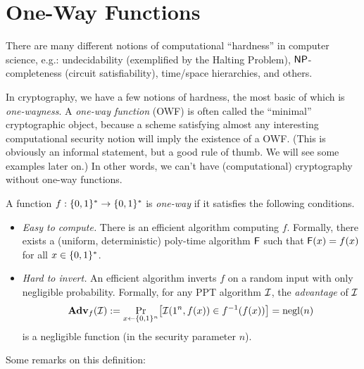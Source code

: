 \documentclass[11pt]{article}
\begin{document}
\section{One-Way Functions}
\label{sec:one-way-functions}

There are many different notions of computational ``hardness'' in
computer science, e.g.: undecidability (exemplified by the Halting
Problem), $\mathsf{NP}$-completeness (circuit satisfiability), time/space
hierarchies, and others.

In cryptography, we have a few notions of hardness, the most basic of
which is \emph{one-wayness}.  A \emph{one-way function} (OWF) is often
called the ``minimal'' cryptographic object, because a scheme
satisfying almost any interesting computational security notion will
imply the existence of a OWF.  (This is obviously an informal
statement, but a good rule of thumb.  We will see some examples later
on.)  In other words, we can't have (computational) cryptography
without one-way functions.

\begin{definition}
  \label{def:owf}
  A function $f : \{0,1\}^{*} \to \{0,1\}^{*}$ is \emph{one-way} if it
  satisfies the following conditions.
  \begin{itemize}
  \item \emph{Easy to compute.}  There is an efficient algorithm
    computing $f$.  Formally, there exists a (uniform, deterministic)
    poly-time algorithm $\mathsf{F}$ such that $\mathsf{F}(x) = f(x)$ for
    all $x \in \{0,1\}^{*}$.
  \item \emph{Hard to invert.}  An efficient algorithm inverts $f$ on
    a random input with only negligible probability.  Formally, for
    any PPT algorithm $\mathcal{I}$, the \emph{advantage} of
    $\mathcal{I}$ \[ \advan_{f}(\Inv) := \Pr_{x \gets \bit^{n}} \bracks*{
      \Inv(1^{n}, f(x)) \in f^{-1}(f(x)) } = \negl(n) \] is a
    negligible function (in the security parameter $n$).
  \end{itemize}
\end{definition}

\noindent Some remarks on this definition:
\end{document}

